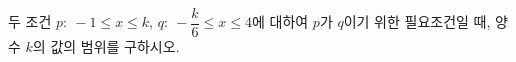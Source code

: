 두 조건 $p:\ -1\le x\le k$, $q:\ -\dfrac{k}{6}\le x\le 4$에 대하여 $p$가 $q$이기 위한 필요조건일 때, 양수 $k$의 값의 범위를 구하시오.
